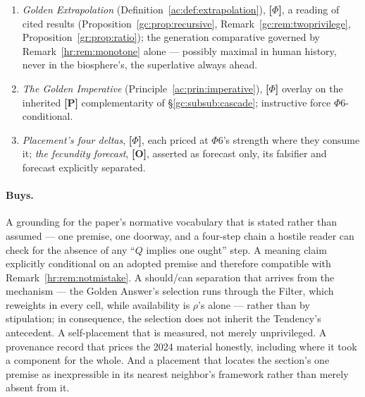 \documentclass[11pt]{article}
\numberwithin{equation}{section}
\theoremstyle{plain}
\theoremstyle{definition}
\theoremstyle{remark}
\begin{document}
\begin{enumerate}
    \item \emph{Golden Extrapolation} (Definition~\ref{ac:def:extrapolation}), \textbf{[$\Phi$]}, a reading of cited results (Proposition~\ref{gc:prop:recursive}, Remark~\ref{gc:rem:twoprivilege}, Proposition~\ref{gr:prop:ratio}); the generation comparative governed by Remark~\ref{hr:rem:monotone} alone --- possibly maximal in human history, never in the biosphere's, the superlative always ahead.
    \item \emph{The Golden Imperative} (Principle~\ref{ac:prin:imperative}), \textbf{[$\Phi$]} overlay on the inherited \textbf{[P]} complementarity of \S\ref{gc:subsub:cascade}; instructive force $\Phi6$-conditional.
    \item \emph{Placement's four deltas}, \textbf{[$\Phi$]}, each priced at $\Phi6$'s strength where they consume it; \emph{the fecundity forecast}, \textbf{[O]}, asserted as forecast only, its falsifier and forecast explicitly separated.
\end{enumerate}

\paragraph{Buys.} A grounding for the paper's normative vocabulary that is stated rather than assumed --- one premise, one doorway, and a four-step chain a hostile reader can check for the absence of any ``$Q$ implies one ought'' step. A meaning claim explicitly conditional on an adopted premise and therefore compatible with Remark~\ref{hr:rem:notmistake}. A should/can separation that arrives from the mechanism --- the Golden Answer's selection runs through the Filter, which reweights in every cell, while availability is $\rho$'s alone --- rather than by stipulation; in consequence, the selection does not inherit the Tendency's antecedent. A self-placement that is measured, not merely unprivileged. A provenance record that prices the 2024 material honestly, including where it took a component for the whole. And a placement that locates the section's one premise as inexpressible in its nearest neighbor's framework rather than merely absent from it.
\end{document}
